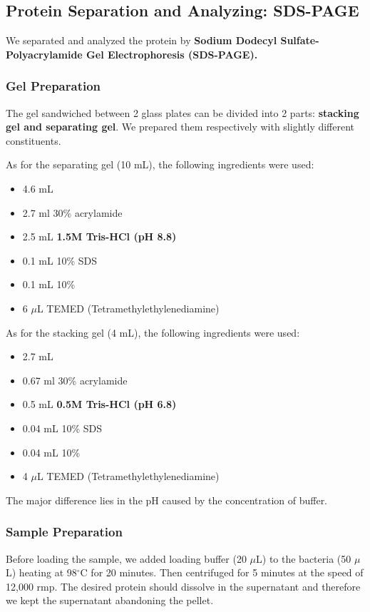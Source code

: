 \documentclass{article}
\begin{document}
\subsection{Protein Separation and Analyzing: SDS-PAGE}
We separated and analyzed the protein by \textbf{Sodium Dodecyl Sulfate-Polyacrylamide Gel Electrophoresis (SDS-PAGE).} 
\subsubsection{Gel Preparation}
The gel sandwiched between 2 glass plates can be divided into 2 parts: \textbf{stacking gel and separating gel}. We prepared them respectively with slightly different constituents.

As for the separating gel (10 mL), the following ingredients were used:
\begin{itemize}
    \item 4.6 mL 
    \item 2.7 ml 30\% acrylamide
    \item 2.5 mL \textbf{1.5M Tris-HCl (pH 8.8)}
    \item 0.1 mL 10\% SDS
    \item 0.1 mL 10\% 
    \item 6 $\mu$L TEMED (Tetramethylethylenediamine)
\end{itemize} 

As for the stacking gel (4 mL), the following ingredients were used:
\begin{itemize}
    \item 2.7 mL 
    \item 0.67 ml 30\% acrylamide
    \item 0.5 mL \textbf{0.5M Tris-HCl (pH 6.8)}
    \item 0.04 mL 10\% SDS
    \item 0.04 mL 10\% 
    \item 4 $\mu$L TEMED (Tetramethylethylenediamine)
\end{itemize}
The major difference lies in the pH caused by the concentration of buffer.
\subsubsection{Sample Preparation}
Before loading the sample, we added loading buffer (20 $\mu$L) to the bacteria (50 $\mu$L) heating at 98$^\circ$C for 20 minutes.
Then centrifuged for 5 minutes at the speed of 12,000 rmp.
The desired protein should dissolve in the supernatant and therefore we kept the supernatant abandoning the pellet.
\end{document}
